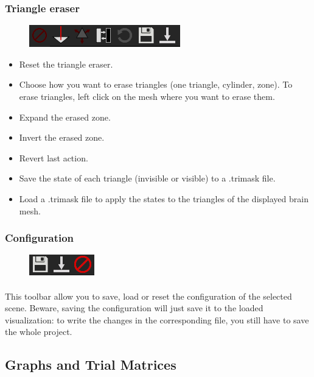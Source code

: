\documentclass[a4paper]{article}
\begin{document}
\subsubsection{Triangle eraser}
\begin{figure}[H]
\begin{center}
\includegraphics[scale=0.5]{TriEraser.png}
\end{center}
\end{figure}
\begin{itemize}
\item Reset the triangle eraser.
\item Choose how you want to erase triangles (one triangle, cylinder, zone). To erase triangles, left click on the mesh where you want to erase them.
\item Expand the erased zone.
\item Invert the erased zone.
\item Revert last action.
\item Save the state of each triangle (invisible or visible) to a .trimask file.
\item Load a .trimask file to apply the states to the triangles of the displayed brain mesh.
\end{itemize}
\subsubsection{Configuration}
\begin{figure}[H]
\begin{center}
\includegraphics[scale=0.5]{Configuration.png}
\end{center}
\end{figure}
\paragraph{} This toolbar allow you to save, load or reset the configuration of the selected scene. Beware, saving the configuration will just save it to the loaded visualization: to write the changes in the corresponding file, you still have to save the whole project.
\subsection{Graphs and Trial Matrices}\label{graphs}
\end{document}

